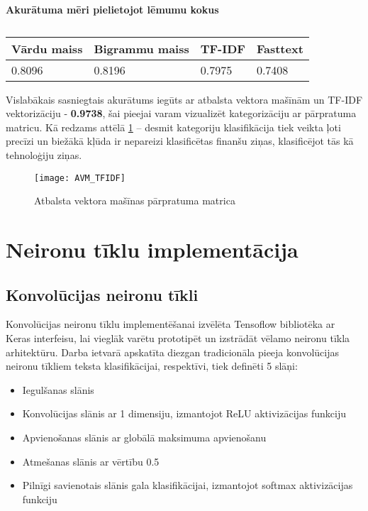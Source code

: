 \begin{table}[H]
\centering
\caption{\label{tab:accuracy_dt}}
\textbf{Akurātuma mēri pielietojot lēmumu kokus\\}
\begin{tabular}{|l|l|l|l|}
\hline
Vārdu maiss & Bigrammu maiss & TF-IDF & Fasttext \\ \hline
0.8096 & 0.8196 & 0.7975 & 0.7408 \\ \hline
\end{tabular}
\end{table}


Vislabākais sasniegtais akurātums iegūts ar atbalsta vektora mašīnām un TF-IDF vektorizāciju - \textbf{0.9738}, šai pieejai varam vizualizēt kategorizāciju ar pārpratuma matricu. Kā redzams attēlā \ref{fig:AVM_TFIDF} – desmit  kategoriju klasifikācija tiek veikta ļoti precīzi un biežākā kļūda ir nepareizi klasificētas finanšu ziņas, klasificējot tās kā tehnoloģiju ziņas.

\begin{figure}[H]
	\centering
	\texttt{[image: AVM\_TFIDF]}
	\caption{Atbalsta vektora mašīnas pārpratuma matrica}
	\label{fig:AVM_TFIDF}
\end{figure}

\section{Neironu tīklu implementācija}
\subsection{Konvolūcijas neironu tīkli}
Konvolūcijas neironu tīklu implementēšanai izvēlēta Tensoflow bibliotēka ar Keras interfeisu, lai vieglāk varētu prototipēt un izstrādāt vēlamo neironu tīkla arhitektūru. Darba ietvarā apskatīta diezgan tradicionāla pieeja konvolūcijas neironu tīkliem teksta klasifikācijai, respektīvi, tiek definēti 5 slāņi:

\begin{itemize}
\item Iegulšanas slānis
\item Konvolūcijas slānis ar 1 dimensiju, izmantojot ReLU aktivizācijas funkciju
\item Apvienošanas slānis ar globālā maksimuma apvienošanu
\item Atmešanas slānis ar vērtību 0.5
\item Pilnīgi savienotais slānis gala klasifikācijai, izmantojot softmax aktivizācijas funkciju
\end{itemize}

